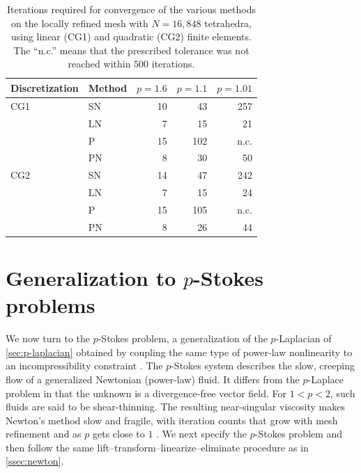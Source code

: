 \documentclass[11pt,pdflatex,sn-mathphys-num]{sn-jnl}
\theoremstyle{thmstyleone}%
\theoremstyle{thmstyletwo}%
\theoremstyle{thmstylethree}%
\begin{document}
\begin{table}[t]
    \centering
    \caption{Iterations required for convergence of the various methods on the locally refined mesh with $N=16{,}848$ tetrahedra, using linear (CG1) and quadratic (CG2) finite elements.
    The ``n.c.'' means that the prescribed tolerance was not reached within $500$ iterations.}
    \label{tab:p-Lapl-3d}

    \begin{tabular}{llrrr}
        \toprule
        Discretization & Method & $p=1.6$ & $p=1.1$ & $p=1.01$ \\
        \midrule
        CG1 & SN  & 10 & 43 & 257 \\
            & LN   & 7  & 15 & 21  \\
            & P          & 15 & 102 & n.c. \\
            & PN  & 8  & 30 & 50  \\
        \addlinespace
        CG2 & SN & 14 & 47  & 242 \\
            & LN   & 7  & 15  & 24  \\
            & P          & 15 & 105 & n.c. \\
            & PN  & 8  & 26  & 44  \\
        \bottomrule
    \end{tabular}
\end{table}

\section{Generalization to $p$-Stokes problems}
\label{sec:p-stokes}
We now turn to the $p$-Stokes problem, a generalization of the $p$-Laplacian of \cref{sec:p-laplacian} obtained by coupling the same type of power-law nonlinearity to an incompressibility constraint \cite{BulicekGwiazdaMalekEtAl12, CuffeyPaterson10}.
The $p$-Stokes system describes the slow, creeping flow of a generalized Newtonian (power-law) fluid. It differs from the $p$-Laplace problem in that the unknown is a divergence-free vector field. For $1<p< 2$, such fluids are said to be shear-thinning. The resulting near-singular viscosity makes Newton's method slow and fragile, with iteration counts that grow with 
mesh refinement and as $p$ gets close to $1$
\cite{schmidt-pStokes-global,MM-pNavierStokes}. We next specify the $p$-Stokes problem and then follow the same lift--transform--linearize--eliminate procedure as in \cref{ssec:newton}.
\end{document}
